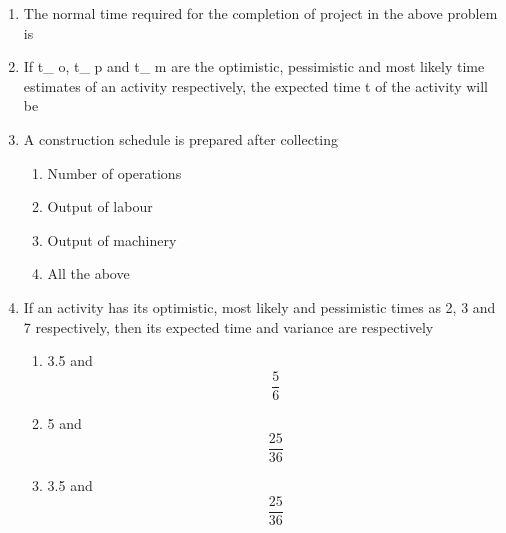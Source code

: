 \documentclass[11pt,a4paper]{article}
\begin{document}
\begin{enumerate}
\item{The normal time required for the completion of project in the above problem is}
\\
\item{If t\_ o, t\_ p and t\_ m are the optimistic, pessimistic and most likely time estimates of an activity respectively, the expected time t of the activity will be}
\\
\item{A construction schedule is prepared after collecting}
\begin{enumerate}[label=\Alph*.]
\item{Number of operations}
\item{Output of labour}
\item{Output of machinery}
\item{All the above}
\end{enumerate}
\item{If an activity has its optimistic, most likely and pessimistic times as 2, 3 and 7 respectively, then its expected time and variance are respectively}
\begin{enumerate}[label=\Alph*.]
\item{3.5 and $$\frac{5}{6}$$}
\item{5 and $$\frac{{25}}{{36}}$$}
\item{3.5 and $$\frac{{25}}{{36}}$$}

\end{enumerate}
\end{enumerate}
\end{document}
